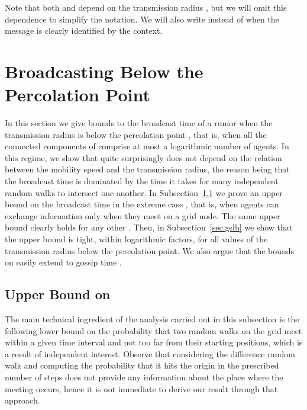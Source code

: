 \documentclass[11pt]{article}
\begin{document}
Note that both  and  depend on the transmission radius
, but we will omit this dependence to simplify the notation.
We will also write  instead of  when the message 
is clearly identified by the context.


\section{Broadcasting Below the Percolation Point}
\label{sec:gs}

In this section we give bounds to the broadcast time  of a
rumor when the transmission radius is below the percolation point , that is, when all the connected components of
 comprise at most a logarithmic number of agents.  In this
regime, we show that quite surprisingly  does not depend on the
relation between the mobility speed and the transmission radius, the
reason being that the broadcast time is dominated by the time it takes
for many independent random walks to intersect one another.  In
Subsection~\ref{sec:gsub} we prove an upper bound on the broadcast
time  in the extreme case , that is, when agents can
exchange information only when they meet on a grid node. The same
upper bound clearly holds for any other . Then, in
Subsection~\ref{sec:gslb} we show that the upper bound is tight,
within logarithmic factors, for all values of the transmission radius
below the percolation point.  We also argue that the bounds on 
easily extend to gossip time .

\subsection{Upper Bound on }
\label{sec:gsub}

The main technical ingredient of the analysis carried out in this
subsection is the following lower bound on the probability that two
random walks  on the grid meet within a given time
interval and not too far from their starting positions, which is a
result of independent interest.  Observe that considering the
difference random walk  and computing the
probability that it hits the origin in the prescribed number of steps
does not provide any information about the place where the meeting
occurs, hence it is not immediate to derive our result through that
approach.
\end{document}
